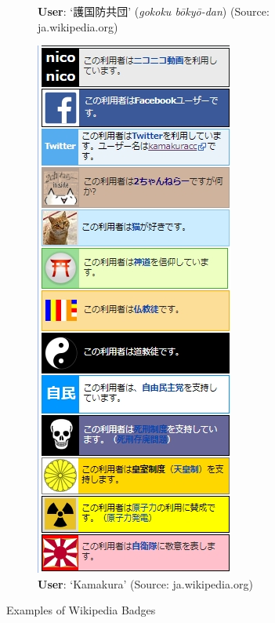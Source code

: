 \documentclass[10pt,british,A4paper,twoside]{memoir}
\begin{document}
\begin{figure}[!htb]
\begin{subfigure}[b]{0.3\textwidth}
 \caption{\textbf{User}: `護国防共団' (\textit{gokoku bōkyō-dan}) (Source: ja.wikipedia.org)}
 \label{fig:defense-corps}
 \end{subfigure}
 \begin{subfigure}[b]{0.3\textwidth}
 \includegraphics[width=\textwidth]{images/wiki/kamakura.jpg}
 \caption{\textbf{User}: `Kamakura' (Source: ja.wikipedia.org)}
 \label{fig:kamakura}
 \end{subfigure}
 \caption{Examples of Wikipedia Badges}\label{fig:badge-examples}
\end{figure}
\end{document}
